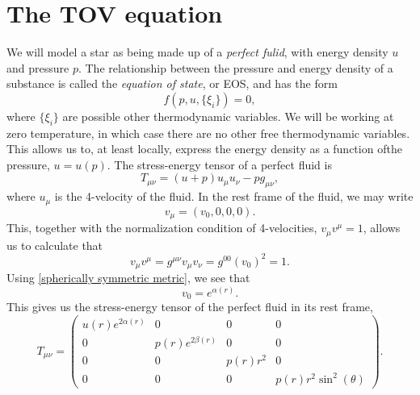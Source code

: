 \section{The TOV equation}

We will model a star as being made up of a \emph{perfect fulid}, with energy density $u$ and pressure $p$.
The relationship between the pressure and energy density of a substance is called the \emph{equation of state}, or EOS, and has the form
\begin{equation}
    \label{EOS}
    f(p, u, \{\xi_i\}) = 0,
\end{equation}
where $\{\xi_i\}$ are possible other thermodynamic variables.
We will be working at zero temperature, in which case there are no other free thermodynamic variables.
This allows us to, at least locally, express the energy density as a function ofthe pressure, $u = u(p)$.
The stress-energy tensor of a perfect fluid is
%
\begin{equation}
    T_{\mu \nu} = (u + p) u_\mu u_\nu - p g_{\mu \nu},
\end{equation} 
where $u_\mu$ is the 4-velocity of the fluid.
In the rest frame of the fluid, we may write 
\begin{equation}
    v_\mu = \left(v_0, 0, 0, 0\right).
\end{equation}
This, together with the normalization condition of 4-velocities, $v_\mu v^\mu = 1$, allows us to calculate that
%
\begin{equation}
    v_\mu v^\mu = g^{\mu \nu} v_\mu v_\nu = g^{00} (v_0)^2 = 1.
\end{equation}
%
Using \autoref{spherically symmetric metric}, we see that
\begin{equation}
    v_0 = e^{\alpha(r)}.
\end{equation}
%
This gives us the stress-energy tensor of the perfect fluid in its rest frame,
%
\begin{equation}
    T_{\mu \nu} 
    =
    \left(
        \begin{matrix}
            u{\left(r \right)} e^{2 \alpha{\left(r \right)}} & 0 & 0 & 0\\0 & 
            p{\left(r \right)} e^{2 \beta{\left(r \right)}} & 0 & 0\\
            0 & 0 & p{\left(r \right)} r^{2} & 0\\
            0 & 0 & 0 & p{\left(r \right)} r^{2} \sin^{2}{\left(\theta \right)}
        \end{matrix}
    \right).
\end{equation}
